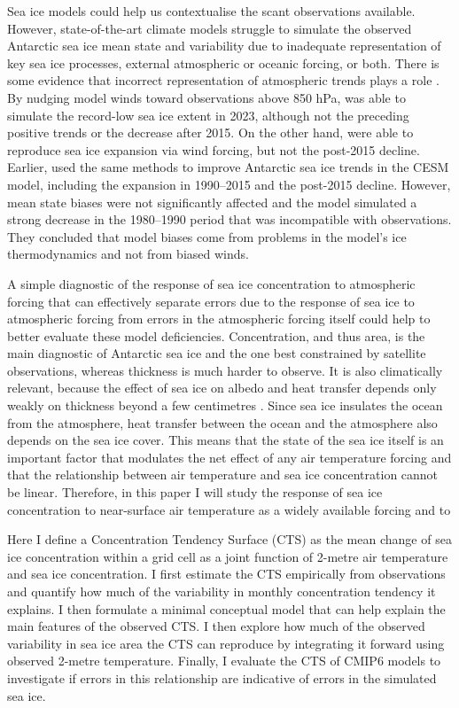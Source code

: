 \documentclass[tc, manuscript]{copernicus}
\begin{document}
Sea ice models could help us contextualise the scant observations
available. However, state-of-the-art climate models struggle to simulate
the observed Antarctic sea ice mean state and variability
\citep{roach2020, roach2026} due to inadequate representation of key sea
ice processes, external atmospheric or oceanic forcing, or both. There
is some evidence that incorrect representation of atmospheric trends
plays a role \citep{purich2016}. By nudging model winds toward
observations above 850 hPa, \citet{espinosa2024} was able to simulate
the record-low sea ice extent in 2023, although not the preceding
positive trends or the decrease after 2015. On the other hand,
\citet{roach2023} were able to reproduce sea ice expansion via wind
forcing, but not the post-2015 decline. Earlier,
\citet{blanchard-wrigglesworth2021} used the same methods to improve
Antarctic sea ice trends in the CESM model, including the expansion in
1990--2015 and the post-2015 decline. However, mean state biases were
not significantly affected and the model simulated a strong decrease in
the 1980--1990 period that was incompatible with observations. They
concluded that model biases come from problems in the model's ice
thermodynamics and not from biased winds.

A simple diagnostic of the response of sea ice concentration to
atmospheric forcing that can effectively separate errors due to the
response of sea ice to atmospheric forcing from errors in the
atmospheric forcing itself could help to better evaluate these model
deficiencies. Concentration, and thus area, is the main diagnostic of
Antarctic sea ice and the one best constrained by satellite
observations, whereas thickness is much harder to observe. It is also
climatically relevant, because the effect of sea ice on albedo and heat
transfer depends only weakly on thickness beyond a few centimetres
\citep{makshtas1991}. Since sea ice insulates the ocean from the
atmosphere, heat transfer between the ocean and the atmosphere also
depends on the sea ice cover. This means that the state of the sea ice
itself is an important factor that modulates the net effect of any air
temperature forcing and that the relationship between air temperature
and sea ice concentration cannot be linear. Therefore, in this paper I
will study the response of sea ice concentration to near-surface air
temperature as a widely available forcing and to

Here I define a Concentration Tendency Surface (CTS) as the mean change
of sea ice concentration within a grid cell as a joint function of
2-metre air temperature and sea ice concentration. I first estimate the
CTS empirically from observations and quantify how much of the
variability in monthly concentration tendency it explains. I then
formulate a minimal conceptual model that can help explain the main
features of the observed CTS. I then explore how much of the observed
variability in sea ice area the CTS can reproduce by integrating it
forward using observed 2-metre temperature. Finally, I evaluate the CTS
of CMIP6 models to investigate if errors in this relationship are
indicative of errors in the simulated sea ice.
\end{document}
